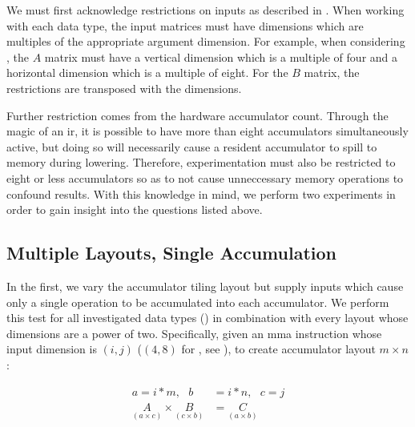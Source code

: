 \documentclass[\main/thesis.tex]{subfiles}
\begin{document}
We must first acknowledge restrictions on inputs as described in .
When working with each data type, the input matrices must have dimensions which are multiples of the appropriate argument dimension.
For example, when considering , the $A$ matrix must have a vertical dimension which is a multiple of four and a horizontal dimension which is a multiple of eight.
For the $B$ matrix, the restrictions are transposed with the dimensions.

Further restriction comes from the hardware accumulator count.
Through the magic of an \gls{ir}, it is possible to have more than eight accumulators simultaneously active, but doing so will necessarily cause a resident accumulator to \gls{spill} to memory during \gls{lowering}.
Therefore, experimentation must also be restricted to eight or less accumulators so as to not cause unneccessary memory operations to confound results.
With this knowledge in mind, we perform two experiments in order to gain insight into the questions listed above.

\subsection{Multiple Layouts, Single Accumulation}
\label{sec:mlsa}
In the first, we vary the accumulator tiling layout but supply inputs which cause only a single operation to be accumulated into each accumulator.
We perform this test for all investigated data types () in combination with every layout whose dimensions are a power of two.
Specifically, given an \gls{mma} instruction whose input dimension is $(i, j)$ (\eg $(4, 8)$ for , see ), to create accumulator layout $m \times n$:

\begin{equation}
  \begin{split}
    a = i * m, \text{ } b &= i * n, \text{ } c = j\\
    \underset{(a \times c)}{A} \times \underset{(c \times b)}{B} &= \underset{(a \times b)}{C}
  \end{split}
\end{equation}
\end{document}

